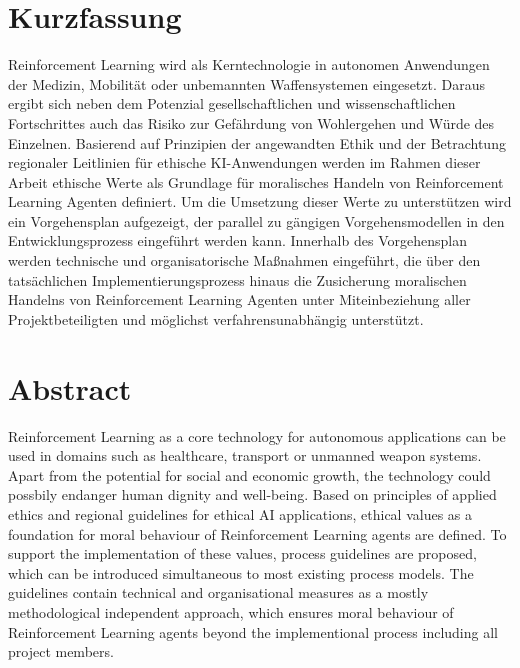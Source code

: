 \thispagestyle{plain}
\section*{Kurzfassung}
Reinforcement Learning wird als Kerntechnologie in autonomen Anwendungen der Medizin, Mobilität oder unbemannten Waffensystemen eingesetzt.
Daraus ergibt sich neben dem Potenzial gesellschaftlichen und wissenschaftlichen Fortschrittes auch das Risiko zur Gefährdung von Wohlergehen und Würde des Einzelnen.
Basierend auf Prinzipien der angewandten Ethik und der Betrachtung regionaler Leitlinien für ethische KI-Anwendungen werden im Rahmen dieser Arbeit ethische Werte als Grundlage für moralisches Handeln von Reinforcement Learning Agenten definiert.
Um die Umsetzung dieser Werte zu unterstützen wird ein Vorgehensplan aufgezeigt, der parallel zu gängigen Vorgehensmodellen in den Entwicklungsprozess eingeführt werden kann.
Innerhalb des Vorgehensplan werden technische und organisatorische Maßnahmen eingeführt, die über den tatsächlichen Implementierungsprozess hinaus die Zusicherung moralischen Handelns von Reinforcement Learning Agenten unter Miteinbeziehung aller Projektbeteiligten und möglichst verfahrensunabhängig unterstützt.  

\section*{Abstract}
Reinforcement Learning as a core technology for autonomous applications can be used in domains such as healthcare, transport or unmanned weapon systems.
Apart from the potential for social and economic growth, the technology could possbily endanger human dignity and well-being.
Based on principles of applied ethics and regional guidelines for ethical AI applications, ethical values as a foundation for moral behaviour of Reinforcement Learning agents are defined.
To support the implementation of these values, process guidelines are proposed, which can be introduced simultaneous to most existing process models.
The guidelines contain technical and organisational measures as a mostly methodological independent approach, which ensures moral behaviour of Reinforcement Learning agents beyond the implementional process including all project members.